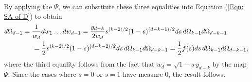 \documentclass[twoside,11pt]{article}
\begin{document}
By applying the $\Psi$, we can substitute these three equalities into Equation (\ref{Eqn: SA of D}) to obtain
\begin{align*}
 d\Omega_{d-1} = \frac{1}{w_d} dw_1 \dots dw_{d-1}
       &= \frac{y_{d-k}}{2w_d} s^{(k-2)/2} (1-s)^{(d-k-1)/2} ds\, d\Omega_{k-1}  d\Omega_{d-k-1}\\
       &\hspace{-1in}= \frac{1}{2} s^{(k-2)/2} (1-s)^{(d-k-2)/2}  ds \, d\Omega_{k-1} d\Omega_{d-k-1}=\frac{1}{2} f(s)ds \, d\Omega_{k-1} d\Omega_{d-k-1},
\end{align*}
where the third equality follows from the fact that $w_d = \sqrt{1-s}y_{d-k}$ by the map $\Psi$.  Since the cases where $s=0$ or $s=1$ have measure $0$, the result follows.\hfill\BlackBox\\[2mm]


\end{document}
